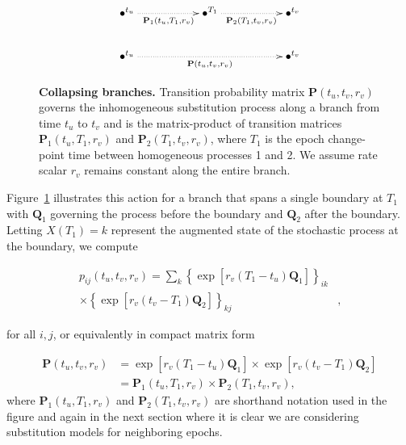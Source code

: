 \begin{figure}[H]
\centering
\begingroup
\everymath{\displaystyle}
{\Large
\begin{displaymath} %
    \xymatrix{ 
    \bullet^{t_u} \ar@{.>}[rr]_{\mathbf{P}_{1}(t_{u},T_{1},r_v)} && \bullet^{T_1} \ar@{.>}[rr]_{\mathbf{P}_{2}(T_{1},t_{v},r_v)} && \bullet^{t_v} \\
    \bullet^{t_u} \ar@{.>}[rrrr]_{\mathbf{P}(t_{u},t_{v},r_v)} & & & & \bullet^{t_v}
    } %
\end{displaymath}
}
\endgroup
\caption{
{ \footnotesize 
{\bf Collapsing branches.} Transition probability matrix $\mathbf{P}(t_u,t_v,r_v)$ governs the inhomogeneous substitution process along a branch from time $t_u$ to $t_v$ and is the matrix-product of transition matrices $\mathbf{P}_{1}(t_u,T_1,r_v)$ and $\mathbf{P}_{2}(T_1,t_v,r_v)$, where $T_1$ is the epoch change-point time between homogeneous processes 1 and 2.  We assume rate scalar $r_v$ remains constant along the entire branch.
} %
}
\label{fig:collapsing}
\end{figure}

Figure~\ref{fig:collapsing} illustrates this action for a branch that spans a single boundary at $T_1$ with $\mathbf{Q}_1$ governing the process before the boundary and $\mathbf{Q}_2$ after the boundary. Letting $X(T_1) = k$ represent the augmented state of the stochastic process at the boundary, we compute

\begin{align}
p_{ij}(t_u, t_v, r_v)
= \sum_{k} 
\left\{
\exp[ r_v ( T_1 - t_u ) \mathbf{Q}_1]
\right\}_{ik} & \nonumber \\
\times 
\left\{
\exp[ r_v ( t_v - T_1 ) \mathbf{Q}_2]
\right\}_{kj} & , 
\end{align}

\noindent
for all $i,j$, or equivalently in compact matrix form

\begin{align}
\mathbf{P}(t_u, t_v, r_v)
&= 
\exp[ r_v ( T_1 - t_u ) \mathbf{Q}_1]
\times
\exp[ r_v ( t_v - T_1 ) \mathbf{Q}_2] \nonumber \\
&= \mathbf{P}_{1}(t_u, T_1, r_v) \times \mathbf{P}_{2}(T_1, t_v, r_v) ,
\label{matrixProduct}
\end{align}
where 
$\mathbf{P}_{1}(t_u, T_1, r_v)$ and $\mathbf{P}_{2}(T_1, t_v, r_v)$ are shorthand notation used in the figure and again in the next section where it is clear we are considering substitution models for neighboring epochs.


